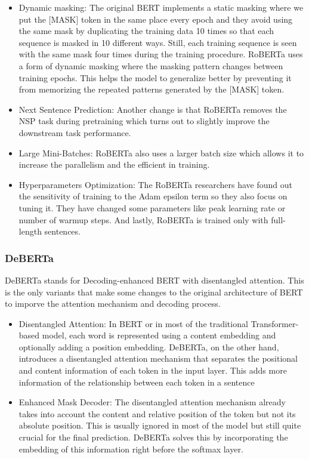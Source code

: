 \documentclass[conference]{IEEEtran}
\begin{document}
\begin{itemize}
    \item Dynamic masking: The original BERT implements a static masking where we put the [MASK]
    token in the same place every epoch and they avoid using the same mask by duplicating the
    training data 10 times so that each sequence is masked in 10 different ways. Still, each training
    sequence is seen with the same mask four times during the training procedure. RoBERTa uses a form
    of dynamic masking where the masking pattern changes between training epochs. This helps the
    model to generalize better by preventing it from memorizing the repeated patterns generated by the [MASK] token.
    \item Next Sentence Prediction: Another change is that RoBERTa removes the NSP task during
    pretraining which turns out to slightly improve the downstream task performance.
    \item Large Mini-Batches: RoBERTa also uses a larger batch size which allows it to increase the parallelism and the efficient in training.
    \item Hyperparameters Optimization: The RoBERTa researchers have found out the sensitivity of
    training to the Adam epsilon term so they also focus on tuning it. They have changed some
    parameters like peak learning rate or number of warmup steps. And lastly, RoBERTa is trained only with full-length sentences.
    
\end{itemize}

\vspace{3mm}
\subsubsection{DeBERTa\cite{he2021deberta}} 
DeBERTa stands for Decoding-enhanced BERT with disentangled attention. This is the only
variants that make some changes to the original architecture of BERT to imporve the
attention mechanism and decoding process.

\begin{itemize}
    \item Disentangled Attention: In BERT or in most of the traditional Transformer-based
    model, each word is represented using a content embedding and optionally adding a position
    embedding. DeBERTa, on the other hand, introduces a disentangled attention mechanism that
    separates the positional and content information of each token in the input layer. This adds more
    information of the relationship between each token in a sentence
    
    \item Enhanced Mask Decoder: The disentangled attention mechanism already takes into account the
    content and relative position of the token but not its absolute position. This is usually ignored
    in most of the model but still quite crucial for the final prediction. DeBERTa solves this by
    incorporating the embedding of this information right before the softmax layer.
\end{itemize}
\end{document}
